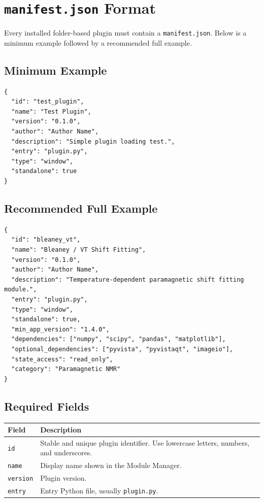 \documentclass[11pt, a4paper]{article}
\begin{document}
\section{\texttt{manifest.json} Format}

Every installed folder-based plugin must contain a \texttt{manifest.json}. Below is a minimum example followed by a recommended full example.

\subsection{Minimum Example}

\begin{lstlisting}[style=json]
{
  "id": "test_plugin",
  "name": "Test Plugin",
  "version": "0.1.0",
  "author": "Author Name",
  "description": "Simple plugin loading test.",
  "entry": "plugin.py",
  "type": "window",
  "standalone": true
}
\end{lstlisting}

\subsection{Recommended Full Example}

\begin{lstlisting}[style=json]
{
  "id": "bleaney_vt",
  "name": "Bleaney / VT Shift Fitting",
  "version": "0.1.0",
  "author": "Author Name",
  "description": "Temperature-dependent paramagnetic shift fitting module.",
  "entry": "plugin.py",
  "type": "window",
  "standalone": true,
  "min_app_version": "1.4.0",
  "dependencies": ["numpy", "scipy", "pandas", "matplotlib"],
  "optional_dependencies": ["pyvista", "pyvistaqt", "imageio"],
  "state_access": "read_only",
  "category": "Paramagnetic NMR"
}
\end{lstlisting}

\subsection{Required Fields}

\begin{tabularx}{\linewidth}{@{}M{3.2cm}L@{}}
  \toprule
  \textbf{Field} & \textbf{Description} \\
  \midrule
  \texttt{id} & Stable and unique plugin identifier. Use lowercase letters, numbers, and underscores. \\
  \texttt{name} & Display name shown in the Module Manager. \\
  \texttt{version} & Plugin version. \\
  \texttt{entry} & Entry Python file, usually \texttt{plugin.py}. \\
  \bottomrule
\end{tabularx}
\end{document}
